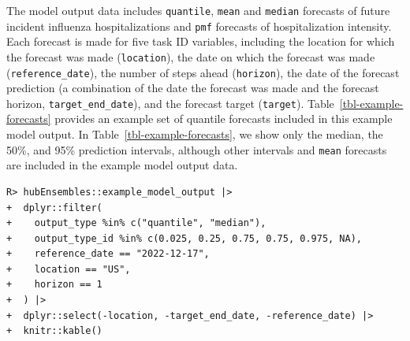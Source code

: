 \documentclass[
  article,
  shortnames,
  notitle]{jss}
\begin{document}
The model output data includes \texttt{quantile}, \texttt{mean} and
\texttt{median} forecasts of future incident influenza hospitalizations
and \texttt{pmf} forecasts of hospitalization intensity. Each forecast
is made for five task ID variables, including the location for which the
forecast was made (\texttt{location}), the date on which the forecast
was made (\texttt{reference\_date}), the number of steps ahead
(\texttt{horizon}), the date of the forecast prediction (a combination
of the date the forecast was made and the forecast horizon,
\texttt{target\_end\_date}), and the forecast target (\texttt{target}).
Table~\ref{tbl-example-forecasts} provides an example set of quantile
forecasts included in this example model output. In
Table~\ref{tbl-example-forecasts}, we show only the median, the 50\%,
and 95\% prediction intervals, although other intervals and
\texttt{mean} forecasts are included in the example model output data.

\begin{verbatim}
R> hubEnsembles::example_model_output |>
+  dplyr::filter(
+    output_type %in% c("quantile", "median"),
+    output_type_id %in% c(0.025, 0.25, 0.75, 0.75, 0.975, NA),
+    reference_date == "2022-12-17",
+    location == "US",
+    horizon == 1
+  ) |>
+  dplyr::select(-location, -target_end_date, -reference_date) |>
+  knitr::kable()
\end{verbatim}
\end{document}
